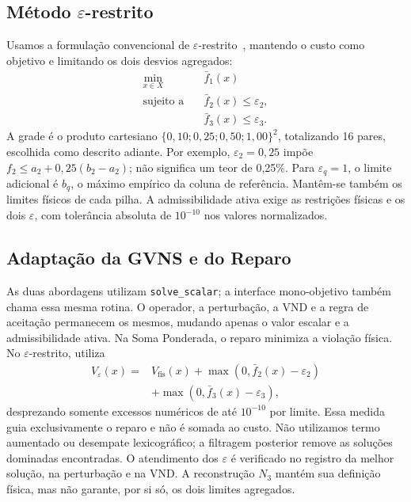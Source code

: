 \documentclass[conference]{IEEEtran}
\begin{document}
\subsection{Método $\varepsilon$-restrito}
Usamos a formulação convencional de $\varepsilon$-restrito~\cite{gams_eps},
mantendo o custo como objetivo e limitando os dois desvios agregados:
\begin{align}
\min_{x\in X}\quad &\bar f_1(x)\\
\text{sujeito a}\quad &\bar f_2(x)\leq\varepsilon_2,\\
&\bar f_3(x)\leq\varepsilon_3.
\end{align}
A grade é o produto cartesiano $\{0{,}10;0{,}25;0{,}50;1{,}00\}^2$, totalizando
16 pares, escolhida como descrito adiante. Por exemplo, $\varepsilon_2=0{,}25$ impõe
$f_2\leq a_2+0{,}25(b_2-a_2)$; não significa um teor de 0,25\%.
Para $\varepsilon_q=1$, o limite adicional é $b_q$, o máximo empírico
da coluna de referência. Mantêm-se também os limites físicos de cada pilha.
A admissibilidade ativa exige as restrições físicas e os dois $\varepsilon$,
com tolerância absoluta de $10^{-10}$ nos valores normalizados.

\subsection{Adaptação da GVNS e do Reparo}
As duas abordagens utilizam \texttt{solve\_scalar}; a interface mono-objetivo
também chama essa mesma rotina. O operador, a perturbação, a VND e a regra
de aceitação permanecem os mesmos, mudando apenas o valor escalar e a
admissibilidade ativa. Na Soma Ponderada, o reparo minimiza a violação física.
No $\varepsilon$-restrito, utiliza
\begin{equation}
\begin{split}
V_\varepsilon(x)={}&V_{\mathrm{fis}}(x)+\max(0,\bar f_2(x)-\varepsilon_2)\\
&+\max(0,\bar f_3(x)-\varepsilon_3),
\end{split}
\end{equation}
desprezando somente excessos numéricos de até $10^{-10}$ por limite.
Essa medida guia exclusivamente o reparo e não é somada ao custo.
Não utilizamos termo aumentado ou desempate lexicográfico; a filtragem
posterior remove as soluções dominadas encontradas.
O atendimento dos $\varepsilon$ é verificado no registro da melhor solução,
na perturbação e na VND. A reconstrução $N_3$ mantém sua definição física,
mas não garante, por si só, os dois limites agregados.
\end{document}
